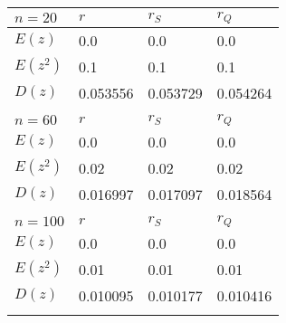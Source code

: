 \begin{tabular}{|l|l|l|l|}\hline $n=20$&$r$&$r_S$&$r_Q$  \\\hline$E(z)$&0.0&0.0&0.0\\\hline$E(z^2)$&0.1&0.1&0.1\\\hline$D(z)$&0.053556&0.053729&0.054264\\\hline &  &  &  \\\hline $n=60$&$r$&$r_S$&$r_Q$  \\\hline$E(z)$&0.0&0.0&0.0\\\hline$E(z^2)$&0.02&0.02&0.02\\\hline$D(z)$&0.016997&0.017097&0.018564\\\hline &  &  &  \\\hline $n=100$&$r$&$r_S$&$r_Q$  \\\hline$E(z)$&0.0&0.0&0.0\\\hline$E(z^2)$&0.01&0.01&0.01\\\hline$D(z)$&0.010095&0.010177&0.010416\\\hline &  &  &  \\\hline \end{tabular}

